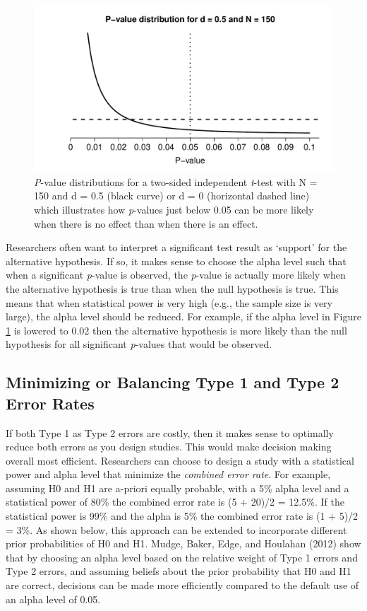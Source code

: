 \documentclass[
  english,
  ,man,floatsintext]{apa6}
\begin{document}
\begin{figure}
\centering
\includegraphics{Justify_in_Practice_files/figure-latex/p-plot-1.pdf}
\caption{\label{fig:p-plot}\emph{P}-value distributions for a two-sided independent \emph{t}-test with N = 150 and d = 0.5 (black curve) or d = 0 (horizontal dashed line) which illustrates how \emph{p}-values just below 0.05 can be more likely when there is no effect than when there is an effect.}
\end{figure}

Researchers often want to interpret a significant test result as `support' for the alternative hypothesis. If so, it makes sense to choose the alpha level such that when a significant \emph{p}-value is observed, the \emph{p}-value is actually more likely when the alternative hypothesis is true than when the null hypothesis is true. This means that when statistical power is very high (e.g., the sample size is very large), the alpha level should be reduced. For example, if the alpha level in Figure \ref{fig:p-plot} is lowered to 0.02 then the alternative hypothesis is more likely than the null hypothesis for all significant \emph{p}-values that would be observed.

\hypertarget{minimizing-or-balancing-type-1-and-type-2-error-rates}{%
\subsection{Minimizing or Balancing Type 1 and Type 2 Error Rates}\label{minimizing-or-balancing-type-1-and-type-2-error-rates}}

If both Type 1 as Type 2 errors are costly, then it makes sense to optimally reduce both errors as you design studies. This would make decision making overall most efficient. Researchers can choose to design a study with a statistical power and alpha level that minimize the \emph{combined error rate}. For example, assuming H0 and H1 are a-priori equally probable, with a 5\% alpha level and a statistical power of 80\% the combined error rate is (5 + 20)/2 = 12.5\%. If the statistical power is 99\% and the alpha is 5\% the combined error rate is (1 + 5)/2 = 3\%. As shown below, this approach can be extended to incorporate different prior probabilities of H0 and H1. Mudge, Baker, Edge, and Houlahan (2012) show that by choosing an alpha level based on the relative weight of Type 1 errors and Type 2 errors, and assuming beliefs about the prior probability that H0 and H1 are correct, decisions can be made more efficiently compared to the default use of an alpha level of 0.05.
\end{document}
